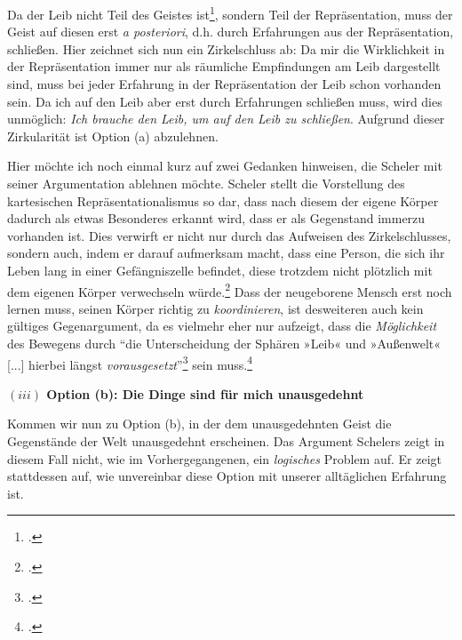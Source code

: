 \documentclass[a4paper, 12pt]{article}
\begin{document}
\begin{onehalfspace}

Da der Leib nicht Teil des Geistes ist\footnote{\Cite[Vgl.][S. 499]{scheler-ethik}.}, sondern Teil der Repräsentation, muss der Geist auf diesen erst \emph{a posteriori}, d.h. durch Erfahrungen aus der Repräsentation, schließen. Hier zeichnet sich nun ein Zirkelschluss ab: Da mir die Wirklichkeit in der Repräsentation immer nur als räumliche Empfindungen am Leib dargestellt sind, muss bei jeder Erfahrung in der Repräsentation der Leib schon vorhanden sein. Da ich auf den Leib aber erst durch Erfahrungen schließen muss, wird dies unmöglich: \emph{Ich brauche den Leib, um auf den Leib zu schließen}. Aufgrund dieser Zirkularität ist Option (a) abzulehnen.

Hier möchte ich noch einmal kurz auf zwei Gedanken hinweisen, die Scheler mit seiner Argumentation ablehnen möchte. Scheler stellt die Vorstellung des kartesischen Repräsentationalismus so dar, dass nach diesem der eigene Körper dadurch als etwas Besonderes erkannt wird, dass er als Gegenstand immerzu vorhanden ist. Dies verwirft er nicht nur durch das Aufweisen des Zirkelschlusses, sondern auch, indem er darauf aufmerksam macht, dass eine Person, die sich ihr Leben lang in einer Gefängniszelle befindet, diese trotzdem nicht plötzlich mit dem eigenen Körper verwechseln würde.\footnote{\Cite[Vgl.][S. 494]{scheler-ethik}.} Dass der neugeborene Mensch erst noch lernen muss, seinen Körper richtig zu \emph{koordinieren}, ist desweiteren auch kein gültiges Gegenargument, da es vielmehr eher nur aufzeigt, dass die \emph{Möglichkeit} des Bewegens durch "`die Unterscheidung der Sphären »Leib« und »Außenwelt« [...] hierbei längst \emph{vorausgesetzt}"'\footnote{\Cite[Siehe][S. 496]{scheler-ethik}.} sein muss.\footnote{\Cite[Vgl. zudem auch][S. 492]{scheler-ethik}.} 


\vspace{5mm}
\noindent\textbf{$(iii)$ Option (b): Die Dinge sind für mich unausgedehnt}


\noindent Kommen wir nun zu Option (b), in der dem unausgedehnten Geist die Gegenstände der Welt unausgedehnt erscheinen. Das Argument Schelers zeigt in diesem Fall nicht, wie im Vorhergegangenen, ein \emph{logisches} Problem auf. Er zeigt stattdessen auf, wie unvereinbar diese Option mit unserer alltäglichen Erfahrung ist.



\end{onehalfspace}
\end{document}
